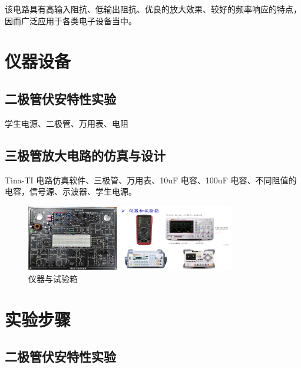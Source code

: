 \documentclass[]{article}
\begin{document}
该电路具有高输入阻抗、低输出阻抗、优良的放大效果、较好的频率响应的特点，因而广泛应用于各类电子设备当中。


\section{仪器设备}

\subsection{二极管伏安特性实验}
学生电源、二极管、万用表、电阻

\subsection{三极管放大电路的仿真与设计}
Tina-TI 电路仿真软件、三极管、万用表、10uF 电容、100uF 电容、不同阻值的电容，信号源、示波器、学生电源。

\begin{figure}[h]
	\centering
	
	\begin{minipage}{0.4\linewidth}
		\centering
		\includegraphics[width=4cm]{img/3_1}
	\end{minipage}
	\begin{minipage}{0.4\linewidth}
		\centering
		\includegraphics[width=5cm]{img/3_2}
	\end{minipage}
	
	\caption{仪器与试验箱}
	
\end{figure}


\section{实验步骤}

\subsection{二极管伏安特性实验}
\end{document}
